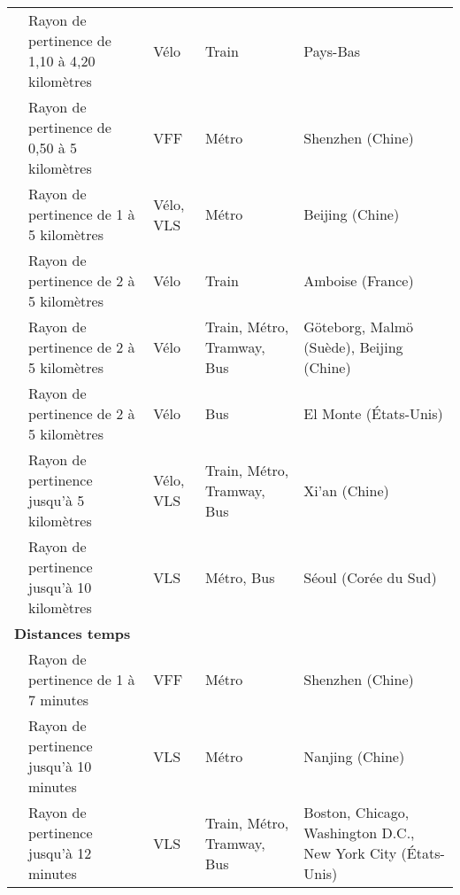 \begin{longtable}{p{3cm}p{4cm}p{1.5cm}p{1.8cm}p{2.3cm}}
    \small{\textcite{debrezion_modelling_2009}}\index{Debrezion, Ghebreegziabiher|pagebf} & \small{Rayon de pertinence de 1,10 à 4,20 kilomètres} & \small{Vélo} & \small{Train} & \small{Pays-Bas}\\
    \small{\textcite{wu_measuring_2019}}\index{Wu, Xueying|pagebf} & \small{Rayon de pertinence de 0,50 à 5 kilomètres} & \small{VFF} & \small{Métro} & \small{Shenzhen (Chine)}\\
    \small{\textcite{zhao_bicycle-metro_2017}}\index{Zhao, Pengjun|pagebf} & \small{Rayon de pertinence de 1 à 5 kilomètres} & \small{Vélo, VLS} & \small{Métro} & \small{Beijing (Chine)}\\
    \small{\textcite{midenet_modal_2018}}\index{Midenet, Sophie|pagebf} & \small{Rayon de pertinence de 2 à 5 kilomètres} & \small{Vélo} & \small{Train} & \small{Amboise (France)}\\
    \small{\textcite{hamidi_shaping_2020}}\index{Hamidi, Zahra|pagebf} & \small{Rayon de pertinence de 2 à 5 kilomètres} & \small{Vélo} & \small{Train, Métro, Tramway, Bus} & \small{Göteborg, Malmö (Suède), Beijing (Chine)}\\
    \small{\textcite{cottrell_transforming_2007}}\index{Cottrell, Wayne D.|pagebf} & \small{Rayon de pertinence de 2 à 5 kilomètres} & \small{Vélo} & \small{Bus} & \small{El Monte (États-Unis)}\\
    \small{\textcite{yang_bike-and-ride_2014}}\index{Yang, Liu|pagebf}\index{Yang, Liu|pagebf} & \small{Rayon de pertinence jusqu'à 5 kilomètres} & \small{Vélo, VLS} & \small{Train, Métro, Tramway, Bus} & \small{Xi'an (Chine)}\\
    \small{\textcite{kim_analysis_2021}}\index{Kim, Minjun|pagebf} & \small{Rayon de pertinence jusqu'à 10 kilomètres} & \small{VLS} & \small{Métro, Bus} & \small{Séoul (Corée du Sud)}\\
    \hline
\multicolumn{5}{l}{\textbf{Distances temps}}\\
    \small{\textcite{li_factors_2020}}\index{Li, Xuefeng|pagebf} & \small{Rayon de pertinence de 1 à 7 minutes} & \small{VFF} & \small{Métro} & \small{Shenzhen (Chine)}\\
    \small{\textcite{liu_understanding_2020}}\index{Liu, Yang|pagebf} & \small{Rayon de pertinence jusqu'à 10 minutes} & \small{VLS} & \small{Métro} & \small{Nanjing (Chine)}\\
    \small{\textcite{kong_deciphering_2020}}\index{Kong, Hui|pagebf} & \small{Rayon de pertinence jusqu'à 12 minutes} & \small{VLS} & \small{Train, Métro, Tramway, Bus} & \small{Boston, Chicago, Washington D.C., New York City (États-Unis)}\\

\end{longtable}
